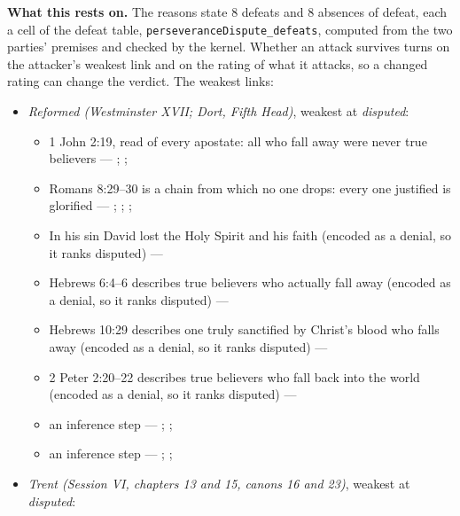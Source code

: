 \documentclass[11pt]{article}
\begin{document}
\par\noindent\textbf{What this rests on.} The reasons state 8 defeats and 8 absences of defeat, each a cell of the defeat table, \texttt{perseverance\allowbreak{}Dispute\_\allowbreak{}defeats}, computed from the two parties' premises and checked by the kernel. Whether an attack survives turns on the attacker's weakest link and on the rating of what it attacks, so a changed rating can change the verdict. The weakest links:
\begin{itemize}
\item \emph{Reformed (Westminster XVII; Dort, Fifth Head)}, weakest at \emph{disputed}:
\begin{itemize}
\item 1 John 2:19, read of every apostate: all who fall away were never true believers --- \cite[594--595]{owen-works-11-perseverance}; \cite[191--192]{calvin-commentaries-catholic-epistles}; \cite[479--480]{npnf1-05-1887}
\item Romans 8:29–30 is a chain from which no one drops: every one justified is glorified --- \cite[582--583]{schaff-creeds-christendom-3-1977}; \cite[557]{schaff-creeds-christendom-3-1977}; \cite[384]{wesley-explanatory-notes-nt}; \cite[413]{wesley-works-9-1827}
\item In his sin David lost the Holy Spirit and his faith (encoded as a denial, so it ranks disputed) --- \cite[299--300]{calvin-psalms-2-1846}
\item Hebrews 6:4–6 describes true believers who actually fall away (encoded as a denial, so it ranks disputed) --- \cite[137--138]{calvin-hebrews-1853}
\item Hebrews 10:29 describes one truly sanctified by Christ’s blood who falls away (encoded as a denial, so it ranks disputed) --- \cite[545--546]{owen-works-23-1855}
\item 2 Peter 2:20–22 describes true believers who fall back into the world (encoded as a denial, so it ranks disputed) --- \cite[410--412]{calvin-commentaries-catholic-epistles}
\item an inference step --- \cite[444--445]{wesley-works-9-1827}; \cite[415--416]{calvin-commentary-john-1847}; \cite[Solid Declaration XI.45]{concordia-triglotta-1921}
\item an inference step --- \cite[Trent, Session VI (1547), ch. 13]{tanner-decrees-1990}; \cite[40]{waterworth-trent-1848}; \cite[Solid Declaration XI.42]{concordia-triglotta-1921}
\end{itemize}
\item \emph{Trent (Session VI, chapters 13 and 15, canons 16 and 23)}, weakest at \emph{disputed}:

\end{itemize}
\end{document}
